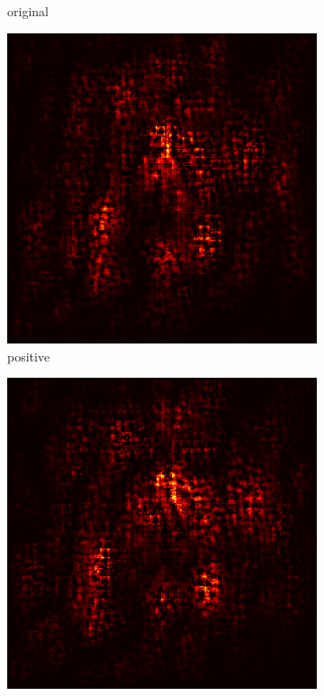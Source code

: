 \documentclass[preprint,12pt]{elsarticle}
\begin{document}
\begin{figure}
\begin{subfigure}{0.14\linewidth}
        \caption{original}
    \end{subfigure}
    \hfill
    \begin{subfigure}{0.14\textwidth}
        \centering
        \includegraphics[width=\linewidth]{../visualizations/examples/imagenette/cnn/positive_saliency_map/5.png}
        \caption{positive}
    \end{subfigure}
    \hfill
    \begin{subfigure}{0.14\textwidth}
        \centering
        \includegraphics[width=\linewidth]{../visualizations/examples/imagenette/cnn/negative_saliency_map/5.png}

\end{subfigure}
\end{figure}
\end{document}
